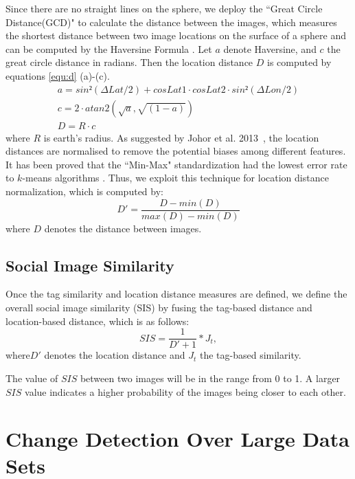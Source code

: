 \documentclass[runningheads,a4paper]{llncs}
\begin{document}
Since there are no straight lines on the sphere, 
we deploy the ``Great Circle Distance(GCD)" to calculate the distance between the images, which measures the shortest distance between two image locations on the surface of a sphere and can be computed by the Haversine Formula \cite{10.2307/2309088}. Let $a$ denote Haversine, and $c$ the great circle distance in radians. Then the location distance $D$ is computed by equations \ref{equ:d} (a)-(c).
\begin{eqnarray}\label{equ:d}
	a = sin²(ΔLat/2) + cos Lat1 ⋅ cos Lat2 ⋅ sin²(ΔLon/2)\\
	c = 2 ⋅ atan2(  \sqrt{a},  \sqrt{(1-a)} )\\
	D = R ⋅ c
\end{eqnarray}
\noindent where $R$ is earth's radius. As suggested by Johor et al. 2013~\cite{Standardization}, the location distances are normalised to remove the potential biases among different features. It has been proved that the ``Min-Max" standardization had the lowest error rate to $k$-means algorithms \cite{Standardization}. Thus, we exploit this technique for location distance normalization, which is computed by:
\begin{equation}
D' = \frac{D-min(D)}{max(D)-min(D)}
\end{equation} 	
\noindent where $D$ denotes the distance between images.


\subsection{Social Image Similarity}

Once the tag similarity and location distance measures are defined, 
we define the overall social image similarity (SIS) by fusing the tag-based distance and location-based distance, 
which is as follows:
\begin{equation}
SIS = \frac{1}{D'+1} * J_{t},
\end{equation}
where$D'$ denotes the location distance and $J_t$ the tag-based similarity. 

The value of $SIS$ between two images will be in the range from 0 to 1. 
A larger $SIS$ value indicates a higher probability of the images being closer to each other.

\section{Change Detection Over Large Data Sets}\label{sec-algorithm}
\end{document}
